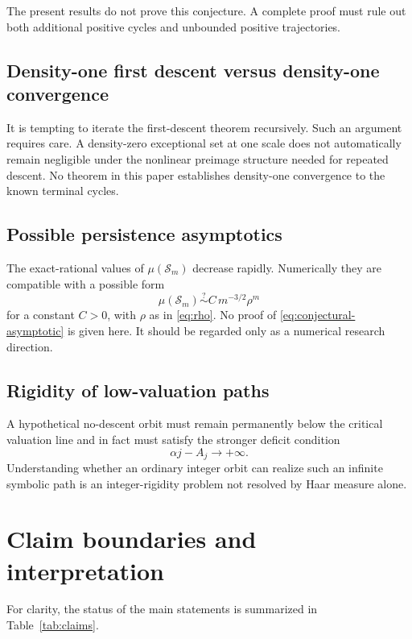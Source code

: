 \documentclass[11pt]{article}
\theoremstyle{definition}
\theoremstyle{remark}
\begin{document}
The present results do not prove this conjecture.  A complete proof must rule out both additional positive cycles and unbounded positive trajectories.

\subsection{Density-one first descent versus density-one convergence}

It is tempting to iterate the first-descent theorem recursively.  Such an argument requires care.  A density-zero exceptional set at one scale does not automatically remain negligible under the nonlinear preimage structure needed for repeated descent.  No theorem in this paper establishes density-one convergence to the known terminal cycles.

\subsection{Possible persistence asymptotics}

The exact-rational values of $\mu(\mathcal S_m)$ decrease rapidly.  Numerically they are compatible with a possible form
\begin{equation}
\mu(\mathcal S_m)
\stackrel{?}{\sim}
C\,m^{-3/2}\rho^m
\label{eq:conjectural-asymptotic}
\end{equation}
for a constant $C>0$, with $\rho$ as in \eqref{eq:rho}.  No proof of \eqref{eq:conjectural-asymptotic} is given here.  It should be regarded only as a numerical research direction.

\subsection{Rigidity of low-valuation paths}

A hypothetical no-descent orbit must remain permanently below the critical valuation line and in fact must satisfy the stronger deficit condition
\[
\alpha j-A_j\to+\infty.
\]
Understanding whether an ordinary integer orbit can realize such an infinite symbolic path is an integer-rigidity problem not resolved by Haar measure alone.

\section{Claim boundaries and interpretation}

For clarity, the status of the main statements is summarized in Table~\ref{tab:claims}.
\end{document}
